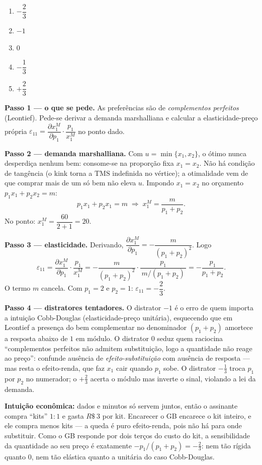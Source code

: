 \begin{enumerate}[label=\Alph*., leftmargin=3.2em, itemsep=0.05em, topsep=0.1em]
  \item $-\dfrac{2}{3}$
  \item $-1$
  \item $0$
  \item $-\dfrac{1}{3}$
  \item $+\dfrac{2}{3}$
\end{enumerate}
\begin{solucao}
\textbf{Passo 1 --- o que se pede.} As preferências são de \emph{complementos perfeitos} (Leontief). Pede-se derivar a demanda marshalliana e calcular a elasticidade-preço própria $\varepsilon_{11}=\dfrac{\partial x_1^{M}}{\partial p_1}\cdot\dfrac{p_1}{x_1^{M}}$ no ponto dado.

\textbf{Passo 2 --- demanda marshalliana.} Com $u=\min\{x_1,x_2\}$, o ótimo nunca desperdiça nenhum bem: consome-se na proporção fixa $x_1=x_2$. Não há condição de tangência (o kink torna a $\text{TMS}$ indefinida no vértice); a otimalidade vem de que comprar mais de um só bem não eleva $u$. Impondo $x_1=x_2$ no orçamento $p_1x_1+p_2x_2=m$:
\[
p_1x_1+p_2x_1=m\;\Rightarrow\; x_1^{M}=\frac{m}{p_1+p_2}.
\]
No ponto: $x_1^{M}=\dfrac{60}{2+1}=20$.

\textbf{Passo 3 --- elasticidade.} Derivando, $\dfrac{\partial x_1^{M}}{\partial p_1}=-\dfrac{m}{(p_1+p_2)^2}$. Logo
\[
\varepsilon_{11}=\frac{\partial x_1^{M}}{\partial p_1}\cdot\frac{p_1}{x_1^{M}}=-\frac{m}{(p_1+p_2)^2}\cdot\frac{p_1}{\,m/(p_1+p_2)\,}=-\frac{p_1}{p_1+p_2}.
\]
O termo $m$ cancela. Com $p_1=2$ e $p_2=1$: $\varepsilon_{11}=-\dfrac{2}{3}$.

\textbf{Passo 4 --- distratores tentadores.} O distrator $-1$ é o erro de quem importa a intuição Cobb-Douglas (elasticidade-preço unitária), esquecendo que em Leontief a presença do bem complementar no denominador $(p_1+p_2)$ amortece a resposta abaixo de $1$ em módulo. O distrator $0$ seduz quem raciocina ``complementos perfeitos não admitem substituição, logo a quantidade não reage ao preço'': confunde ausência de \emph{efeito-substituição} com ausência de resposta --- mas resta o efeito-renda, que faz $x_1$ cair quando $p_1$ sobe. O distrator $-\tfrac13$ troca $p_1$ por $p_2$ no numerador; o $+\tfrac23$ acerta o módulo mas inverte o sinal, violando a lei da demanda.

\textbf{Intuição econômica:} dados e minutos só servem juntos, então o assinante compra ``kits'' $1{:}1$ e gasta $R\$~3$ por kit. Encarecer o GB encarece o kit inteiro, e ele compra menos kits --- a queda é puro efeito-renda, pois não há para onde substituir. Como o GB responde por dois terços do custo do kit, a sensibilidade da quantidade ao seu preço é exatamente $-p_1/(p_1+p_2)=-\tfrac23$: nem tão rígida quanto $0$, nem tão elástica quanto a unitária do caso Cobb-Douglas.
\end{solucao}

